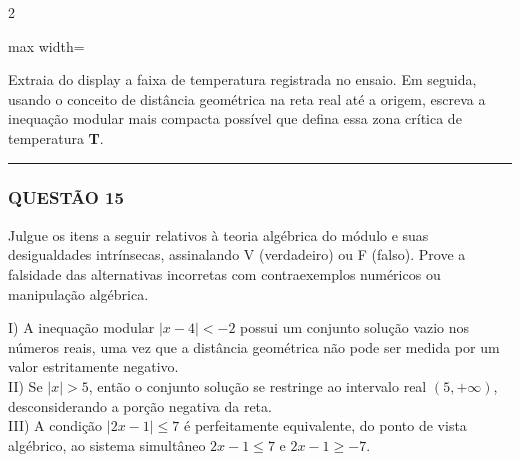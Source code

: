 \documentclass[11pt, a4paper]{article}
\begin{document}
\begin{multicols*}{2}
\begin{center}
\begin{adjustbox}{max width=\linewidth}
\end{adjustbox}
\end{center}

Extraia do display a faixa de temperatura registrada no ensaio. Em seguida, usando o conceito de distância geométrica na reta real até a origem, escreva a inequação modular mais compacta possível que defina essa zona crítica de temperatura \textbf{T}.

\vspace{0cm} \noindent\textcolor{CorLinha}{\rule{\linewidth}{0.5pt}} \vspace{-0.2cm}
\subsubsection*{QUESTÃO 15}
Julgue os itens a seguir relativos à teoria algébrica do módulo e suas desigualdades intrínsecas, assinalando V (verdadeiro) ou F (falso). Prove a falsidade das alternativas incorretas com contraexemplos numéricos ou manipulação algébrica.

I) A inequação modular $ |x - 4| < -2 $ possui um conjunto solução vazio nos números reais, uma vez que a distância geométrica não pode ser medida por um valor estritamente negativo.\\[0.3cm]
II) Se $ |x| > 5 $, então o conjunto solução se restringe ao intervalo real $ (5, +\infty) $, desconsiderando a porção negativa da reta.\\[0.3cm]
III) A condição $ |2x - 1| \le 7 $ é perfeitamente equivalente, do ponto de vista algébrico, ao sistema simultâneo $ 2x - 1 \le 7 $ e $ 2x - 1 \ge -7 $.


\end{multicols*}
\end{document}
